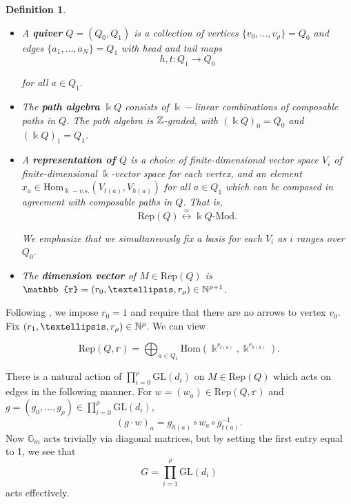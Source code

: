 \documentclass{amsart}
\newtheorem{definition}[theorem]{Definition}
\begin{document}
\begin{definition}\begin{itemize} \text{ } \\
    \item[(i)] \cite{kirillov2016quiver}  A \textbf{quiver} $Q = (Q_0, Q_1)$ is a collection of vertices $\{v_0, \dots, v_\rho\} = Q_0$ and edges $\{a_1, \dots, a_N \} =Q_1$ with head and tail maps 
 \[ h, t: Q_1 \rightarrow Q_0 \]

for all $a \in Q_1$. \\

\item[(ii)] The \textbf{path algebra} $\Bbbk Q$ consists of $\Bbbk-$linear combinations of composable paths in $Q$. The path algebra is $\mathbb{Z}$-graded, with $(\Bbbk Q)_0 = Q_0$ and $(\Bbbk Q)_1 = Q_1$. \\
\item[(iii)] A \textbf{representation of $Q$} is a choice of finite-dimensional vector space $V_i$ of finite-dimensional $\Bbbk$-vector space for each vertex, and an element $x_a\in \mathrm{Hom}_{\Bbbk-v.s.}(V_{t(a)},V_{h(a)})$ for all $a\in Q_1$ which can be composed in agreement with composable paths in $Q$. That is, \[ \text{Rep}(Q) \stackrel{\simeq}{\leftrightarrow} \Bbbk Q\text{-Mod}.\]

We emphasize that we simultaneously fix a basis for each $V_i$ as $i$ ranges over $Q_0$. 

\item[(iv)] The \textbf{dimension vector} of $M \in \text{Rep}(Q)$ is $\mathbb{r} = (r_0, \dots, r_\rho) \in \N^{\rho + 1}$.  \\
\end{itemize}
\end{definition}

Following \cite{CrawDuke2011}, we impose $r_0=1$ and require that there are no arrows to vertex $v_0$. Fix $(r_1, \dots, r_\rho) \in \N^\rho$. We can view

\[ \mathrm{Rep}(Q,\mathbb{r}) = \bigoplus_{a\in Q_1} \mathrm{Hom}(\Bbbk^{r_{t(a)}}, \Bbbk^{r_{h(a)}}).\]

There is a natural action of $\prod_{i=0}^\rho \mathrm{GL}(d_i)$ on $M\in \mathrm{Rep}(Q)$ which acts on edges in the following manner. For $w=(w_a) \in \mathrm{Rep}(Q,\mathbb{r})$ and $g=(g_0, \dots, g_\rho) \in \prod_{i=0}^\rho \mathrm{GL}(d_i)$, \[ (g\cdot w)_a = g_{h(a)}\circ w_a \circ g_{t(a)}^{-1}. \] Now $\mathbb{G}_m$ acts trivially via diagonal matrices, but by setting the first entry equal to 1, we see that \[ G = \prod_{i=1}^\rho \mathrm{GL}(d_i) \] acts effectively. 
\end{document}
